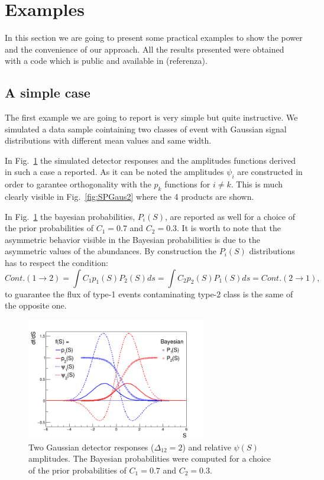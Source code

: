 \section{Examples}
In this section we are going to present some practical examples
to show the power and the convenience of our approach.
All the results presented were obtained with a code which is public and
available in (referenza).
\subsection{A simple case}
The first example we are going to report is very simple but quite instructive.
We simulated a data sample cointaining two classes of event with Gaussian
signal distributions with different mean values and same width.

In Fig.~\ref{fig:Gaus2} the simulated detector responses and the amplitudes
functions derived in such a case a reported. As it can be noted the amplitudes
$\psi_{i}$ are constructed in order to garantee orthogonality with the $p_{k}$
functions for $i \neq k$.
This is much clearly visible in Fig.~\ref{fig:SPGaus2} where the 4 products
are shown.

In Fig.~\ref{fig:Gaus2} the bayesian probabilities,
$P_{i}(S)$, are reported as well for a choice of the prior probabilities of
$C_{1}=0.7$ and $C_{2}=0.3$. It is worth to note that the asymmetric behavior
visible in the Bayesian probabilities is due to the asymmetric values of the
abundances. By construction the $P_{i}(S)$ distributions has to respect the
condition:
\begin{equation} 
\label{Sec3:BayesCond}
Cont. (1\rightarrow 2) = \int C_{1} p_{1}(S) P_{2}(S) ds = \int
C_{2} p_{2}(S) P_{1}(S) ds = Cont. (2\rightarrow 1),
\end{equation}
to guarantee the  flux of type-1 events contaminating
type-2 class is the same of the opposite one.

\begin{figure}[!htb]
\centering
\includegraphics[width=0.7\textwidth]{../png/figGaus2.png}
\caption{Two Gaussian detector responses ($\Delta_{12} = 2$) and relative
  $\psi(S)$ amplitudes. The Bayesian probabilities were computed for a choice
  of the prior probabilities of $C_{1}=0.7$ and $C_{2}=0.3$.}
\label{fig:Gaus2}
\end{figure}

